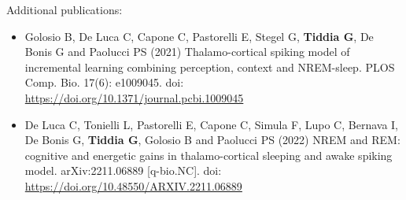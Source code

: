 \documentclass[a4paper, 12pt, twoside, openright]{book}
\begin{document}
Additional publications:

\begin{itemize}
    \item \cite{Golosio2021-ThaCo} Golosio B, De Luca C, Capone C, Pastorelli E, Stegel G, \textbf{Tiddia G}, De Bonis G and Paolucci PS (2021) Thalamo-cortical spiking model of incremental learning combining perception, context and NREM-sleep. PLOS Comp. Bio. 17(6): e1009045. doi: \url{https://doi.org/10.1371/journal.pcbi.1009045}
    \item \cite{DeLuca2023} De Luca C, Tonielli L, Pastorelli E, Capone C, Simula F, Lupo C, Bernava I, De Bonis G, \textbf{Tiddia G}, Golosio B and Paolucci PS (2022) NREM and REM: cognitive and energetic gains in thalamo-cortical sleeping and awake spiking model.  	arXiv:2211.06889 [q-bio.NC]. doi: \url{https://doi.org/10.48550/ARXIV.2211.06889} 
\end{itemize}
\end{document}
